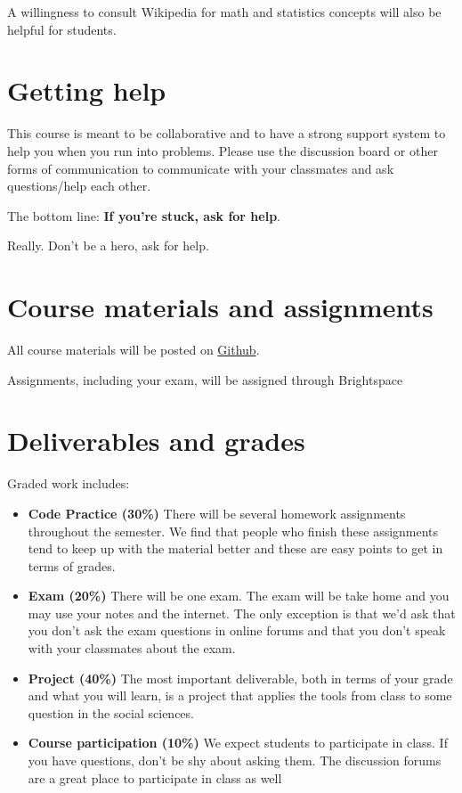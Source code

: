 \documentclass[12pt,pdftex,twoside,letterpaper]{exam}
\begin{document}
    A willingness to consult Wikipedia for math and statistics concepts will also be helpful for
    students.

  \section*{Getting help}

    This course is meant to be collaborative and to have a strong support system to help you when
    you run into problems. Please use the discussion board or other forms of communication to
    communicate with your classmates and ask questions/help each other.

    The bottom line:  {\bf If you're stuck, ask for help\/}.

    Really.  Don't be a hero, ask for help.

  \section*{Course materials and assignments}

    All course materials will be posted on \href{https://github.com/NYU-ComputationalSocialScience/ECON-GA-4004}{Github}.

    Assignments, including your exam, will be assigned through Brightspace

  \section*{Deliverables and grades}

    Graded work includes:

    \begin{itemize}
      \item {\bf Code Practice (30\%)} There will be several homework assignments throughout the
            semester. We find that people who finish these assignments tend to keep up
            with the material better and these are easy points to get in terms of grades.
      \item {\bf Exam (20\%)} There will be one exam. The exam will be take home and you may use
            your notes and the internet. The only exception is that we'd ask that you don't ask
            the exam questions in online forums and that you don't speak with your classmates about
            the exam.
      \item {\bf Project (40\%)} The most important deliverable, both in terms of your grade and
            what you will learn, is a project that applies the tools from class to some question
            in the social sciences.
      \item {\bf Course participation (10\%)} We expect students to participate in class. If you have
            questions, don't be shy about asking them. The discussion forums are a great place to
            participate in class as well
    \end{itemize}
\end{document}
